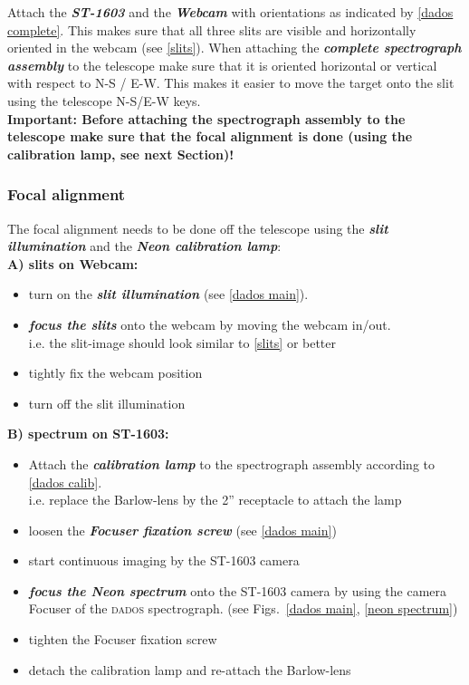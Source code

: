\documentclass[a4paper, 11pt, fleqn]{memoir}
\begin{document}
Attach the \textbf{\textit{ST-1603}} and the \textbf{\textit{Webcam}} with orientations as indicated by \cref{dados complete}.
This makes sure that all three slits are visible and horizontally oriented in the webcam (see \cref{slits}).
When attaching the \textbf{\textit{complete spectrograph assembly}} to the telescope make sure that it is oriented horizontal or vertical with respect to N-S / E-W.
This makes it easier to move the target onto the slit using the telescope N-S/E-W keys.
\\

\textbf{Important: Before attaching the spectrograph assembly to the telescope make sure that the focal alignment is done (using the calibration lamp, see next Section)!}

\subsubsection{Focal alignment}

The focal alignment needs to be done off the telescope using the \textbf{\textit{slit illumination}} and the \textbf{\textit{Neon calibration lamp}}:\\

\textbf{A) slits on Webcam:}
\begin{itemize}
    \item turn on the \textbf{\textit{slit illumination}} (see \cref{dados main}).
    \item
          \textbf{\textit{focus the slits}} onto the webcam by moving the webcam in/out.\\
          i.e. the slit-image should look similar to \cref{slits} or better
    \item
          tightly fix the webcam position
    \item
          turn off the slit illumination
\end{itemize}

\textbf{B) spectrum on ST-1603:}
\begin{itemize}
    \item
          Attach the \textbf{\textit{calibration lamp}} to the spectrograph assembly
          according to \cref{dados calib}.\\ i.e. replace the Barlow-lens by the 2''
          receptacle to attach the lamp
    \item
          loosen the \textbf{\textit{Focuser fixation screw}} (see \cref{dados main})
    \item
          start continuous imaging by the ST-1603 camera
    \item
          \textbf{\textit{focus the Neon spectrum}} onto the ST-1603 camera by using the camera Focuser of the \textsc{dados} spectrograph.
          (see Figs.~\ref{dados main}, \ref{neon spectrum})
    \item
          tighten the Focuser fixation screw
    \item
          detach the calibration lamp and re-attach the Barlow-lens
\end{itemize}
\end{document}
